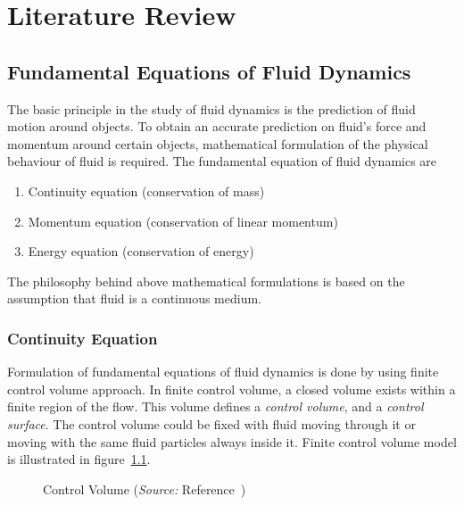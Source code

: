 \chapter{Literature Review}
\section{Fundamental Equations of Fluid Dynamics}
The basic principle in the study of fluid dynamics is the prediction of fluid motion around objects. To obtain an accurate prediction on fluid's force and momentum around certain objects, mathematical formulation of the physical behaviour of fluid is required. The fundamental equation of fluid dynamics are~\cite{JB}
\begin{enumerate}
\item Continuity equation (conservation of mass)
\item Momentum equation (conservation of linear momentum)
\item Energy equation (conservation of energy)
\end{enumerate}

The philosophy behind above mathematical formulations is based on the assumption that fluid is a continuous medium. 
 
\subsection{Continuity Equation}
Formulation of fundamental equations of fluid dynamics is done by using finite control volume approach. In finite control volume, a closed volume exists within a finite region of the flow. This volume defines a \emph{control volume}, and a \emph{control surface}. The control volume could be fixed with fluid moving through it or moving with the same fluid particles always inside it. Finite control volume model is illustrated in figure~\ref{fig:control_volume}.
\begin{figure}[h]
  \centering
  \caption{Control Volume (\emph{Source:} Reference~\cite{JA})}
  \label{fig:control_volume}
\end{figure}

